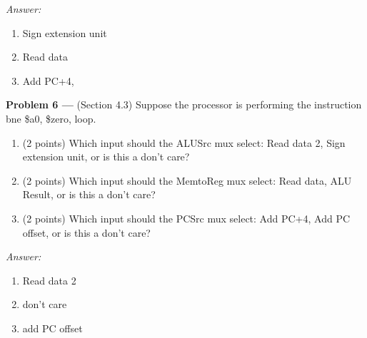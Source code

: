 \documentclass[11pt]{article}
\newcommand{\problem}[1]{\textbf{Problem #1 ---} }
\newcommand{\answer}{{\color{red}\textit{Answer: }}}
\begin{document}
\answer
\begin{enumerate}[(1)]
    \item Sign extension unit
    \item Read data
    \item Add PC+4,
\end{enumerate}

\problem{6}(Section 4.3) Suppose the processor is performing the instruction \textsf{bne \$a0, \$zero, loop}.
\begin{enumerate}
    \item(2 points) Which input should the \textsf{ALUSrc} mux select: Read data 2, Sign extension unit, or is this a don't care?
    \item(2 points) Which input should the \textsf{MemtoReg} mux select:  Read data, ALU Result, or is this a don't care?
    \item(2 points) Which input should the \textsf{PCSrc} mux select: Add PC+4, Add PC offset, or is this a don't care?
\end{enumerate}

\answer
\begin{enumerate}[(1)]
    \item Read data 2
    \item don’t care
    \item add PC offset
\end{enumerate}
\end{document}
